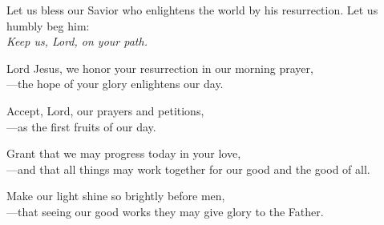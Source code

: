 \intercessions

\begin{raggedright}
Let us bless our Savior who enlightens the world by his resurrection. Let us humbly beg him:\\
\emph{Keep us, Lord, on your path.}

\medskip
Lord Jesus, we honor your resurrection in our morning prayer,\\
{\color{red}---}the hope of your glory enlightens our day.

\medskip
Accept, Lord, our prayers and petitions,\\
{\color{red}---}as the first fruits of our day.

\medskip
Grant that we may progress today in your love,\\
{\color{red}---}and that all things may work together for our good and the good of all.

\medskip
Make our light shine so brightly before men,\\
{\color{red}---}that seeing our good works they may give glory to the Father.
\end{raggedright}